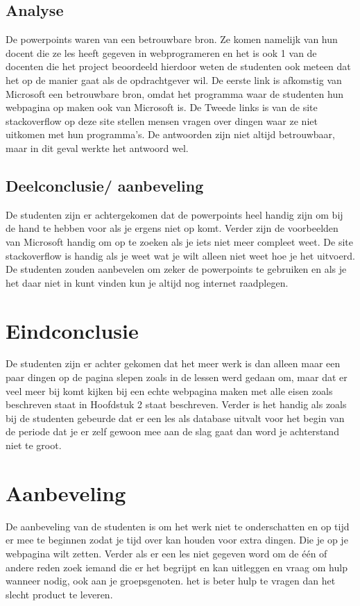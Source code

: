 \documentclass[11pt]{article}
\begin{document}
	\subsection{Analyse}
	De powerpoints waren van een betrouwbare bron. Ze komen namelijk van hun docent die ze les heeft gegeven in webprogrameren en het is ook 1 van de docenten die het project beoordeeld hierdoor weten de studenten ook meteen dat het op de manier gaat als de opdrachtgever wil. De eerste link is afkomstig van Microsoft een betrouwbare bron, omdat het programma waar de studenten hun webpagina op maken ook van Microsoft is. De Tweede links is van de site stackoverflow op deze site stellen mensen vragen over dingen waar ze niet uitkomen met hun programma's. De antwoorden zijn niet altijd betrouwbaar, maar in dit geval werkte het antwoord wel.

	\subsection{Deelconclusie/ aanbeveling}
	De studenten zijn er achtergekomen dat de powerpoints heel handig zijn om bij de hand te hebben voor als je ergens niet op komt. Verder zijn de voorbeelden van Microsoft handig om op te zoeken als je iets niet meer compleet weet. De site stackoverflow is handig als je weet wat je wilt alleen niet weet hoe je het uitvoerd. De studenten zouden aanbevelen om zeker de powerpoints te gebruiken en als je het daar niet in kunt vinden kun je altijd nog internet raadplegen. 
	\newpage
	
	\section{Eindconclusie}
	De studenten zijn er achter gekomen dat het meer werk is dan alleen maar een paar dingen op de pagina slepen zoals in de lessen werd gedaan om, maar dat er veel meer bij komt kijken bij een echte webpagina maken met alle eisen zoals beschreven staat in Hoofdstuk 2 staat beschreven. Verder is het handig als zoals bij de studenten gebeurde dat er een les als database uitvalt voor het begin van de periode dat je er zelf gewoon mee aan de slag gaat dan word je achterstand niet te groot.
	
	
	\section{Aanbeveling}
	De aanbeveling van de studenten is om het werk niet te onderschatten en op tijd er mee te beginnen zodat je tijd over kan houden voor extra dingen. Die je op je webpagina wilt zetten. Verder als er een les niet gegeven word om de één of andere reden zoek iemand die er het begrijpt en kan uitleggen en vraag om hulp wanneer nodig, ook aan je groepsgenoten. het is beter hulp te vragen dan het slecht product te leveren.  
	
\end{document}
